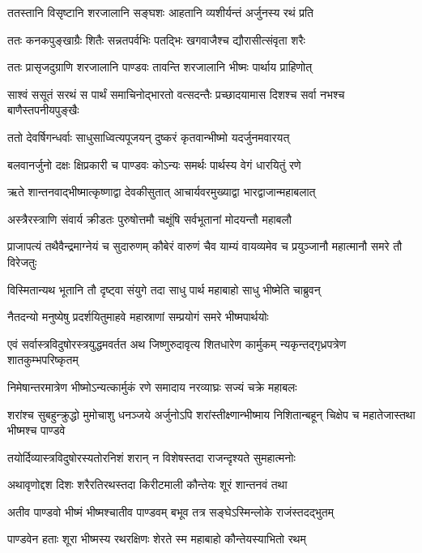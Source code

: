 \twolineshloka
{ततस्तानि विसृष्टानि शरजालानि सङ्घशः}
{आहतानि व्यशीर्यन्तं अर्जुनस्य रथं प्रति}


\twolineshloka
{ततः कनकपुङ्खाग्रैः शितैः सन्नतपर्वभिः}
{पतद्भिः खगवाजैश्च द्यौरासीत्संवृता शरैः}


\twolineshloka
{ततः प्रासृजदुग्राणि शरजालानि पाण्डवः}
{तावन्ति शरजालानि भीष्मः पार्थाय प्राहिणोत्}


\twolineshloka
{साश्वं ससूतं सरथं स पार्थं समाचिनोद्भारतो वत्सदन्तैः}
{प्रच्छादयामास दिशश्च सर्वा नभश्च बाणैस्तपनीयपुङ्खैः}


\twolineshloka
{ततो देवर्षिगन्धर्वाः साधुसाध्वित्यपूजयन्}
{दुष्करं कृतवान्भीष्मो यदर्जुनमवारयत्}


\twolineshloka
{बलवानर्जुनो दक्षः क्षिप्रकारी च पाण्डवः}
{कोऽन्यः समर्थः पार्थस्य वेगं धारयितुं रणे}


\twolineshloka
{ऋते शान्तनवाद्भीष्मात्कृष्णाद्वा देवकीसुतात्}
{आचार्यवरमुख्याद्वा भारद्वाजान्महाबलात्}


\twolineshloka
{अस्त्रैरस्त्राणि संवार्य क्रीडतः पुरुषोत्तमौ}
{चक्षूंषि सर्वभूतानां मोदयन्तौ महाबलौ}


\threelineshloka
{प्राजापत्यं तथैवैन्द्रमाग्नेयं च सुदारुणम्}
{कौबेरं वारुणं चैव याम्यं वायव्यमेव च}
{प्रयुञ्जानौ महात्मानौ समरे तौ विरेजतुः}


\twolineshloka
{विस्मितान्यथ भूतानि तौ दृष्ट्वा संयुगे तदा}
{साधु पार्थ महाबाहो साधु भीष्मेति चाब्रुवन्}


\twolineshloka
{नैतदन्यो मनुष्येषु प्रदर्शयितुमाहवे}
{महास्राणां सम्प्रयोगं समरे भीष्मपार्थयोः}


\onelineshloka
{एवं सर्वास्त्रविदुषोरस्त्रयुद्धमवर्तत}
\twolineshloka
{अथ जिष्णुरुदावृत्य शितधारेण कार्मुकम्}
{न्यकृन्तद्गृध्रपत्रेण शातकुम्भपरिष्कृतम्}


\twolineshloka
{निमेषान्तरमात्रेण भीष्मोऽन्यत्कार्मुकं रणे}
{समादाय नरव्याघ्रः सज्यं चक्रे महाबलः}


\threelineshloka
{शरांश्च सुबहुन्क्रुद्धो मुमोचाशु धनञ्जये}
{अर्जुनोऽपि शरांस्तीक्ष्णान्भीष्माय निशितान्बहून्}
{चिक्षेप च महातेजास्तथा भीष्मश्च पाण्डवे}


\twolineshloka
{तयोर्दिव्यास्त्रविदुषोरस्यतोरनिशं शरान्}
{न विशेषस्तदा राजन्दृश्यते सुमहात्मनोः}


\twolineshloka
{अथावृणोद्दश दिशः शरैरतिरथस्तदा}
{किरीटमाली कौन्तेयः शूरं शान्तनवं तथा}


\twolineshloka
{अतीव पाण्डवो भीष्मं भीष्मश्चातीव पाण्डवम्}
{बभूव तत्र सङ्घेऽस्मिन्लोके राजंस्तदद्भुतम्}


\twolineshloka
{पाण्डवेन हताः शूरा भीष्मस्य रथरक्षिणः}
{शेरते स्म महाबाहो कौन्तेयस्याभितो रथम्}


